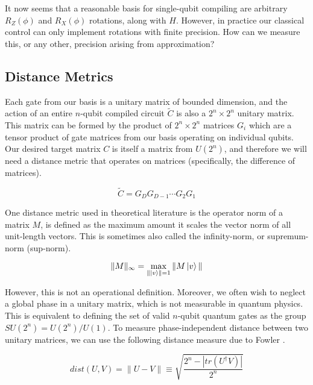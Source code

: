 It now seems that a reasonable basis for single-qubit compiling are
arbitrary $R_Z(\phi)$ and $R_X(\phi)$ rotations, along with $H$.
However, in practice our classical control can only implement
rotations with finite precision. How can we measure this, or any
other, precision arising from approximation?

\subsection{Distance Metrics}
\label{subsec:distance}

Each gate from our basis is a unitary matrix of bounded dimension, and the action of an entire
$n$-qubit compiled circuit $\tilde{C}$
is also a $2^n \times 2^n$ unitary matrix. This matrix can be formed
by the product of $2^n \times 2^n$ matrices $G_i$ which are a tensor
product of gate matrices from our basis operating on individual qubits.
Our desired target matrix $C$ is itself
a matrix from $U(2^n)$, and therefore we will need a distance metric
that operates on matrices (specifically, the difference of matrices).

\begin{equation}
\tilde{C} = G_{D}G_{D-1}\cdots G_{2} G_{1}
\end{equation}

One distance metric used in theoretical literature
is the operator norm of a matrix $M$,
is defined as the maximum amount it scales the vector norm
of all unit-length vectors. This is sometimes also called the
infinity-norm, or supremum-norm (sup-norm).

\begin{equation}
\| M \|_{\infty} = \max_{\| \left\vert{v}\right\rangle \| = 1} \| M \left\vert{v}\right\rangle \|
\end{equation}

However, this is not an operational definition.
Moreover, we often wish to neglect a global phase in a unitary matrix,
which is not measurable in quantum physics. This is equivalent to
defining the set of valid $n$-qubit quantum gates as the
group $SU(2^n) = U(2^n) / U(1)$. To measure phase-independent
distance between two unitary matrices, we can use the following
distance measure due to Fowler \cite{Fowler2011}.

\begin{equation}
dist(U, V) = \| U - V\| \equiv \sqrt{\frac{2^n - |tr(U^{\dag}V)|}{2^n}}
\end{equation}

